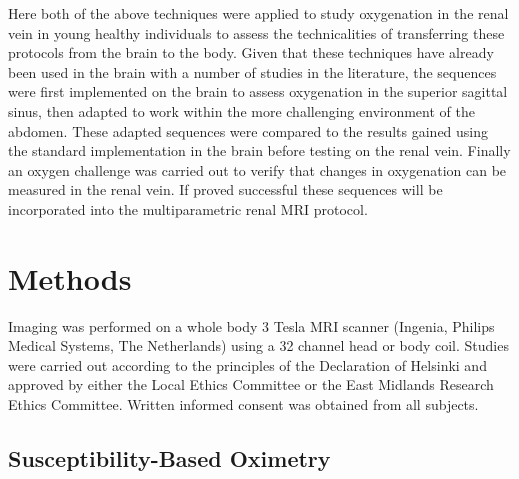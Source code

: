 Here both of the above techniques were applied to study oxygenation in the renal vein in young healthy individuals to assess the technicalities of transferring these protocols from the brain to the body. Given that these techniques have already been used in the brain with a number of studies in the literature, the sequences were first implemented on the brain to assess oxygenation in the superior sagittal sinus, then adapted to work within the more challenging environment of the abdomen. These adapted sequences were compared to the results gained using the standard implementation in the brain before testing on the renal vein. Finally an oxygen challenge was carried out to verify that changes in oxygenation can be measured in the renal vein. If proved successful these sequences will be incorporated into the multiparametric renal \ac{MRI} protocol.

\section{Methods}

Imaging was performed on a whole body 3 Tesla \ac{MRI} scanner (Ingenia, Philips Medical Systems, The Netherlands) using a 32 channel head or body coil. Studies were carried out according to the principles of the Declaration of Helsinki and approved by either the Local Ethics Committee or the East Midlands Research Ethics Committee. Written informed consent was obtained from all subjects.

\subsection{Susceptibility-Based Oximetry}
\label{sec:SBO}
